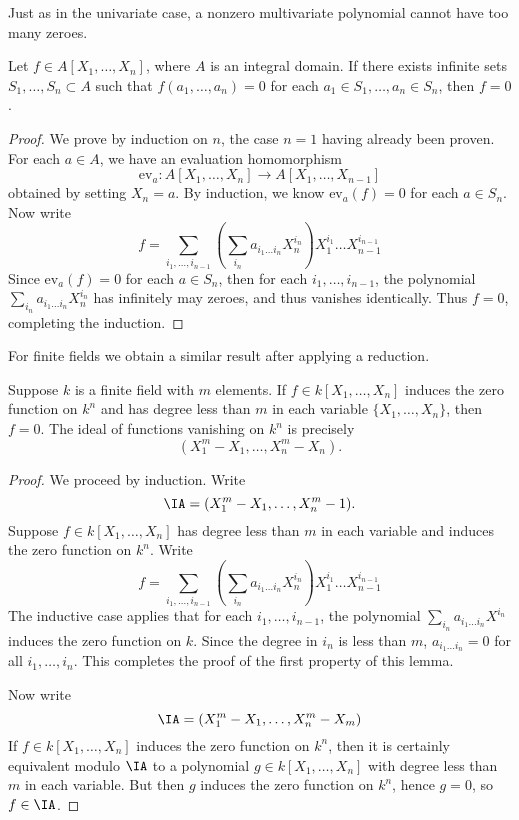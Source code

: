 Just as in the univariate case, a nonzero multivariate polynomial cannot have too many zeroes.

\begin{corollary}
    Let $f \in A[X_1, \dots, X_n]$, where $A$ is an integral domain. If there exists infinite sets $S_1, \dots, S_n \subset A$ such that $f(a_1, \dots, a_n) = 0$ for each $a_1 \in S_1, \dots, a_n \in S_n$, then $f = 0$.
\end{corollary}
\begin{proof}
    We prove by induction on $n$, the case $n = 1$ having already been proven. For each $a \in A$, we have an evaluation homomorphism
    \[ \text{ev}_a: A[X_1, \dots, X_n] \to A[X_1, \dots, X_{n-1}] \]
    obtained by setting $X_n = a$. By induction, we know $\text{ev}_a(f) = 0$ for each $a \in S_n$. Now write
    \[ f = \sum_{i_1, \dots, i_{n-1}}  \left( \sum_{i_n} a_{i_1 \dots i_n} X_n^{i_n} \right) X_1^{i_1} \dots X_{n-1}^{i_{n-1}} \]
    Since $\text{ev}_a(f) = 0$ for each $a \in S_n$, then for each $i_1, \dots, i_{n-1}$, the polynomial $\sum_{i_n} a_{i_1 \dots i_n} X_n^{i_n}$ has infinitely may zeroes, and thus vanishes identically. Thus $f = 0$, completing the induction.
\end{proof}

For finite fields we obtain a similar result after applying a reduction.

\begin{lemma}
    Suppose $k$ is a finite field with $m$ elements. If $f \in k[X_1, \dots, X_n]$ induces the zero function on $k^n$ and has degree less than $m$ in each variable $\{ X_1, \dots, X_n \}$, then $f = 0$. The ideal of functions vanishing on $k^n$ is precisely
    \[ (X_1^m - X_1, \dots, X_n^m - X_n). \]
\end{lemma}
\begin{proof}
    We proceed by induction. Write
    \[ \IA = (X_1^m - X_1,\dots, X_n^m - 1). \]
    Suppose $f \in k[X_1, \dots, X_n]$ has degree less than $m$ in each variable and induces the zero function on $k^n$. Write
    \[ f = \sum_{i_1, \dots, i_{n-1}}  \left( \sum_{i_n} a_{i_1 \dots i_n} X_n^{i_n} \right) X_1^{i_1} \dots X_{n-1}^{i_{n-1}} \]
    The inductive case applies that for each $i_1, \dots, i_{n-1}$, the polynomial $\sum_{i_n} a_{i_1 \dots i_n} X^{i_n}$ induces the zero function on $k$. Since the degree in $i_n$ is less than $m$, $a_{i_1 \dots i_n} = 0$ for all $i_1, \dots, i_n$. This completes the proof of the first property of this lemma.

    Now write
    \[ \IA = (X_1^m - X_1, \dots, X_n^m - X_m) \]
    If $f \in k[X_1, \dots, X_n]$ induces the zero function on $k^n$, then it is certainly equivalent modulo $\IA$ to a polynomial $g \in k[X_1, \dots, X_n]$ with degree less than $m$ in each variable. But then $g$ induces the zero function on $k^n$, hence $g = 0$, so $f \in \IA$.
\end{proof}





